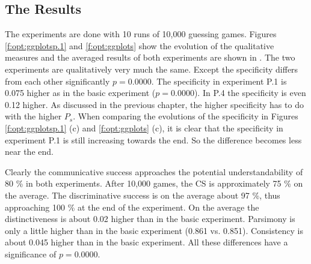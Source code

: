 \subsection{The Results}

The experiments are done with 10 runs of 10,000 guessing games. Figures \ref{f:opt:ggplotsp.1} and \ref{f:opt:ggplots} show the evolution of the qualitative measures and the averaged results of both experiments are shown in . The two experiments are qualitatively very much the same. Except the specificity differs from each other significantly $p=0.0000$. The specificity in experiment P.1 is 0.075 higher as in the basic experiment ($p=0.0000$). In P.4 the specificity is even 0.12 higher. As discussed in the previous chapter, the higher specificity has to do with the higher $P_s$. When comparing the evolutions of the specificity in Figures \ref{f:opt:ggplotsp.1} (c) and \ref{f:opt:ggplots} (c), it is clear that the specificity in experiment P.1 is still increasing towards the end. So the difference becomes less near the end.

Clearly the communicative success approaches the potential understandability of 80 \% in both experiments. After 10,000 games, the CS is approximately 75 \% on the average. The discriminative success is on the average about 97 \%, thus approaching 100 \% at the end of the experiment. On the average the distinctiveness is about 0.02 higher than in the basic experiment. Parsimony is only a little higher than in the basic experiment (0.861 vs. 0.851). Consistency is about 0.045 higher than in the basic experiment. All these differences have a significance of $p=0.0000$.

